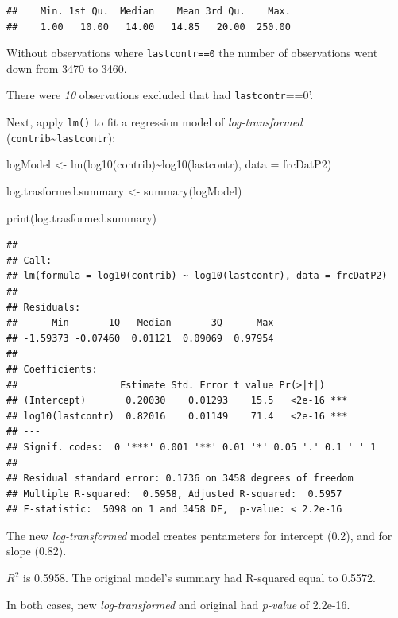 \documentclass[
]{article}
\newenvironment{Shaded}{\begin{snugshade}}{\end{snugshade}}
\newcommand{\AttributeTok}[1]{\textcolor[rgb]{0.77,0.63,0.00}{#1}}
\newcommand{\FunctionTok}[1]{\textcolor[rgb]{0.00,0.00,0.00}{#1}}
\newcommand{\NormalTok}[1]{#1}
\newcommand{\OtherTok}[1]{\textcolor[rgb]{0.56,0.35,0.01}{#1}}
\newcommand{\SpecialCharTok}[1]{\textcolor[rgb]{0.00,0.00,0.00}{#1}}
\begin{document}
\begin{verbatim}
##    Min. 1st Qu.  Median    Mean 3rd Qu.    Max. 
##    1.00   10.00   14.00   14.85   20.00  250.00
\end{verbatim}

Without observations where \texttt{lastcontr==0} the number of
observations went down from 3470 to 3460.

There were \emph{10} observations excluded that had
\texttt{lastcontr}==0'.

Next, apply \texttt{lm()} to fit a regression model of
\emph{log-transformed}
(\texttt{contrib}\textasciitilde{}\texttt{lastcontr}):

\begin{Shaded}
\begin{Highlighting}[]
\NormalTok{logModel }\OtherTok{\textless{}{-}} \FunctionTok{lm}\NormalTok{(}\FunctionTok{log10}\NormalTok{(contrib)}\SpecialCharTok{\textasciitilde{}}\FunctionTok{log10}\NormalTok{(lastcontr), }\AttributeTok{data =}\NormalTok{ frcDatP2)}

\NormalTok{log.trasformed.summary }\OtherTok{\textless{}{-}} \FunctionTok{summary}\NormalTok{(logModel)}

\FunctionTok{print}\NormalTok{(log.trasformed.summary)}
\end{Highlighting}
\end{Shaded}

\begin{verbatim}
## 
## Call:
## lm(formula = log10(contrib) ~ log10(lastcontr), data = frcDatP2)
## 
## Residuals:
##      Min       1Q   Median       3Q      Max 
## -1.59373 -0.07460  0.01121  0.09069  0.97954 
## 
## Coefficients:
##                  Estimate Std. Error t value Pr(>|t|)    
## (Intercept)       0.20030    0.01293    15.5   <2e-16 ***
## log10(lastcontr)  0.82016    0.01149    71.4   <2e-16 ***
## ---
## Signif. codes:  0 '***' 0.001 '**' 0.01 '*' 0.05 '.' 0.1 ' ' 1
## 
## Residual standard error: 0.1736 on 3458 degrees of freedom
## Multiple R-squared:  0.5958, Adjusted R-squared:  0.5957 
## F-statistic:  5098 on 1 and 3458 DF,  p-value: < 2.2e-16
\end{verbatim}

The new \emph{log-transformed} model creates pentameters for intercept
(0.2), and for slope (0.82).

\(R^2\) is 0.5958. The original model's summary had R-squared equal to
0.5572.

In both cases, new \emph{log-transformed} and original had
\emph{p-value} of 2.2e-16.
\end{document}
